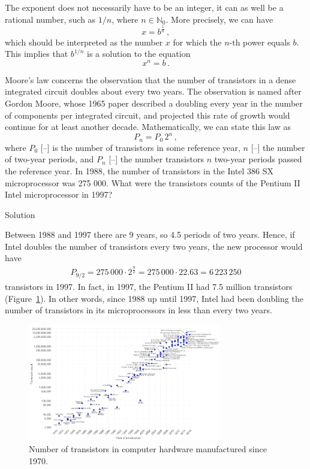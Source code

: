 The exponent does not necessarily have to be an integer, it can as well be a rational number, such as $1/n$, where $n\in\mathbb{N}_0$. More precisely, we can have
$$
x=b^{\frac{1}{n}}\,,
$$
which should be interpreted as the number $x$ for which the $n$-th power equals $b$. This implies that $b^{1/n}$ is a solution to the equation
$$
x^n=b\,. 
$$

\ifcalculus
\begin{example}
	Moore's law concerns the observation that the number of transistors in a dense integrated circuit doubles about every two years. The observation is named after Gordon Moore, whose 1965 paper described a doubling every year in the number of components per integrated circuit, and projected this rate of growth would continue for at least another decade. Mathematically, we can state this law as
	$$
	P_n=P_0\,2^n\,,
	$$
	where $P_0$ [--] is the number of transistors in some reference year, $n$ [--] the number of two-year periods, and $P_n$ [--] the number transistors $n$ two-year periods passed the reference year. In 1988, the number of transistors in the Intel 386 SX microprocessor was 275 000. What were the transistors counts of the Pentium II Intel microprocessor in 1997? 
	
	Solution 
	
	Between 1988 and 1997 there are 9 years, so 4.5 periods of two years. Hence, if Intel doubles the number of transistors every two years, the new processor would have
	\begin{eqnarray*}
		P_{9/2} = 275\,000 \cdot 2^{\frac{9}{2}}
		= 275\,000 \cdot 22.63
		= 6\,223\,250  
	\end{eqnarray*}
	transistors in 1997. In fact, in 1997, the Pentium II had 7.5 million transistors (Figure~\ref{fig_sets_8}). In other words, since 1988 up until 1997, Intel had been doubling the number of transistors in its microprocessors in less than every two years.
	
	\begin{figure}[H]
		\begin{center}
			\includegraphics[width=0.75\textwidth]{fig_sets_8}
			\caption{Number of transistors in computer hardware manufactured since 1970.}
			\label{fig_sets_8}
		\end{center}
	\end{figure}
	
	
\end{example}
\fi

